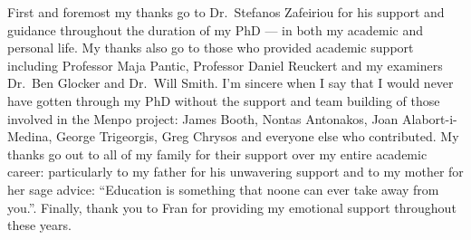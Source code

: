 \begin{acknowledgements}
First and foremost my thanks go to Dr.\ Stefanos Zafeiriou for his support
and guidance throughout the duration of my PhD --- in both my academic and 
personal life. My thanks also go to those who provided academic support
including Professor Maja Pantic, Professor Daniel Reuckert and my examiners
Dr.\ Ben Glocker and Dr.\ Will Smith. I'm sincere when I say that I would never
have gotten through my PhD without the support and team building of those
involved in the Menpo project: James Booth, Nontas Antonakos, 
Joan Alabort-i-Medina, George Trigeorgis, Greg Chrysos and everyone else who 
contributed. My thanks go out to all of my family for their support
over my entire academic career: particularly to my father for his unwavering support
and to my mother for her sage advice: 
``Education is something that noone can ever take away from you.''.
Finally, thank you to Fran for providing my emotional support throughout
these years.
\end{acknowledgements}
